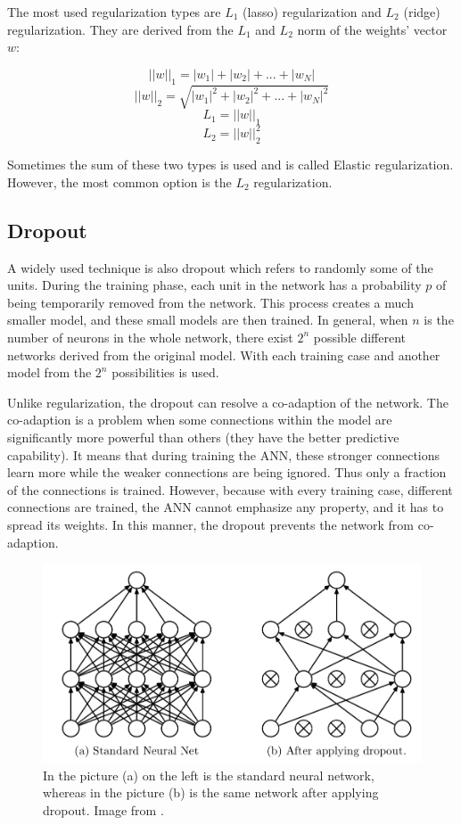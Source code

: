 \documentclass[thesis=B,english]{FITthesis}[2019/12/23]
\begin{document}
The most used regularization types are $L_1$ (lasso) regularization and $L_2$ (ridge) regularization. They are derived from the $L_1$ and $L_2$ norm of the weights' vector $w$:

$$||w||_1 = |w_1| + |w_2| + ... + |w_N|$$
$$||w||_2 = \sqrt{|w_1|^2 + |w_2|^2 + ... + |w_N|^2}$$
$$L_1 = ||w||_1$$
$$L_2 = ||w||_2^2$$

Sometimes the sum of these two types is used and is called Elastic regularization. However, the most common option is the $L_2$ regularization.\cite{Goodfellow-et-al-2016}

\subsection{Dropout}

A widely used technique is also dropout which refers to randomly  some of the units. During the training phase, each unit in the network has a probability $p$ of being temporarily removed from the network. This process creates a much smaller model, and these small models are then trained. In general, when $n$ is the number of neurons in the whole network, there exist $2^n$ possible different networks derived from the original model. With each training case and another model from the $2^n$ possibilities is used.\cite{dropout_art}

Unlike regularization, the dropout can resolve a co-adaption of the network. The co-adaption is a problem when some connections within the model are significantly more powerful than others (they have the better predictive capability). It means that during training the ANN, these stronger connections learn more while the weaker connections are being ignored. Thus only a fraction of the connections is trained. However, because with every training case, different connections are trained, the ANN cannot emphasize any property, and it has to spread its weights. In this manner, the dropout prevents the network from co-adaption.\cite{dropout_art}

\begin{figure}[ht]
		\includegraphics[scale=0.35]{images/dropout.png}
		\centering
		\caption{In the picture (a) on the left is the standard neural network, whereas in the picture (b) is the same network after applying dropout. Image from \cite{dropout_art}.}
\end{figure}
\end{document}
